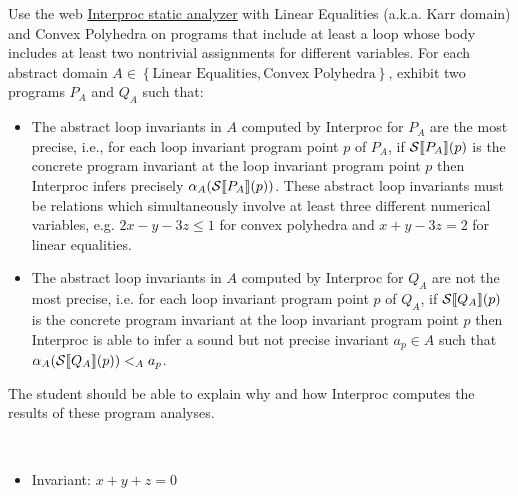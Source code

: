 \begin{exercise}{
    Use the web \href{http://pop-art.inrialpes.fr/interproc/interprocweb.cgi}{Interproc static analyzer} with Linear Equalities (a.k.a. Karr domain) and Convex Polyhedra on programs that include at least a loop whose body includes at least two nontrivial assignments for different variables. For each abstract domain  $A \in \left\{\text{Linear Equalities}, \text{Convex Polyhedra}\right\}$, exhibit two programs $P_A$ and $Q_A$ such that:
    \begin{itemize}
        \item The abstract loop invariants in $A$ computed by Interproc for $P_A$ are the most precise, i.e., for each loop invariant program point $p$ of $P_A$, if $\mathcal{S} \llbracket P_A \rrbracket(p)$ is the concrete program invariant at the loop invariant program point $p$ then Interproc infers precisely $\alpha_A(\mathcal{S} \llbracket P_A \rrbracket(p))$. These abstract loop invariants must be relations which simultaneously involve at least three different numerical variables, e.g. $2x - y -3z \leq 1$ for convex polyhedra and $x + y - 3z = 2$ for linear equalities.
        \item The abstract loop invariants in $A$ computed by Interproc for $Q_A$ are not the most precise, i.e. for each loop invariant program point $p$ of $Q_A$, if $\mathcal{S} \llbracket Q_A \rrbracket(p)$ is the concrete program invariant at the loop invariant program point $p$ then Interproc is able to infer a sound but not precise invariant $a_p \in A$ such that $\alpha_A(\mathcal{S} \llbracket Q_A \rrbracket(p)) <_A a_p$.
    \end{itemize}
    The student should be able to explain why and how Interproc computes the results of these program analyses.
}
    \newcommand{\program}[3]{
        \begin{minipage}[t]{.48\textwidth}
            \centering
            
        \end{minipage}
        \hfill
        \begin{minipage}[t]{.48\textwidth}
            \vspace*{1cm}
            #3
        \end{minipage}
        \\
    }
    \vspace*{-0.6cm}\\
    \program{p_le.simple}{P_\text{Linear Equalities}}{
        \begin{itemize}
            \item Invariant: $x+y+z=0$
        \end{itemize}
}
\end{exercise}
